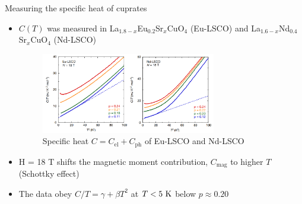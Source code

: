 \documentclass{beamer}
\begin{document}
\begin{frame}{Measuring the specific heat of cuprates}
\begin{itemize}
\item $C(T)$ was measured in La$_{1.8 - x}$Eu$_{0.2}$Sr$_{x}$CuO$_4$ (Eu-LSCO) and La$_{1.6 - x}$Nd$_{0.4}$Sr$_x$CuO$_4$ (Nd-LSCO)\footnotemark
\begin{figure}
\includegraphics[width=3in]{figs/c_raw.png}
\caption*{Specific heat $C = C_{\text{el}} + C_{\text{ph}}$ of Eu-LSCO and Nd-LSCO}
\end{figure}
\item H = 18 T shifts the magnetic moment contribution, $C_{\text{mag}}$ to higher $T$ (Schottky effect)
\item The data obey $C/T = \gamma + \beta T^2$ at $T < 5~\rm{K}$ below $p \approx 0.20$
\end{itemize}
\end{frame}
\end{document}
